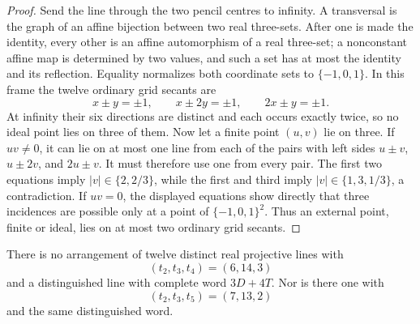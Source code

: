 \begin{proof}
Send the line through the two pencil centres to infinity.  A transversal is
the graph of an affine bijection between two real three-sets.  After one is
made the identity, every other is an affine automorphism of a real
three-set; a nonconstant affine map is determined by two values, and such a
set has at most the identity and its reflection.  Equality normalizes both
coordinate sets to $\{-1,0,1\}$.  In this frame the twelve ordinary grid
secants are
\[
 x\pm y=\pm1,\qquad x\pm2y=\pm1,\qquad 2x\pm y=\pm1.
\]
At infinity their six directions are distinct and each occurs exactly
twice, so no ideal point lies on three of them.  Now let a finite point
$(u,v)$ lie on three.  If $uv\ne0$, it can lie on at most one line from
each of the pairs with left sides $u\pm v$, $u\pm2v$, and $2u\pm v$.
It must therefore use one from every pair.  The first two equations imply
$|v|\in\{2,2/3\}$, while the first and third imply
$|v|\in\{1,3,1/3\}$, a contradiction.  If $uv=0$, the displayed equations
show directly that three incidences are possible only at a point of
$\{-1,0,1\}^2$.  Thus an external point, finite or ideal, lies on at most
two ordinary grid secants.
\end{proof}

\begin{lemma}
\label{lem:gallery-completions}
There is no arrangement of twelve distinct real projective lines with
\begin{equation}
 (t_2,t_3,t_4)=(6,14,3)\label{eq:typeA-vector}
\end{equation}
and a distinguished line with complete word $3D+4T$.  Nor is there one
with
\begin{equation}
 (t_2,t_3,t_5)=(7,13,2)\label{eq:M4-vector}
\end{equation}
and the same distinguished word.
\end{lemma}

